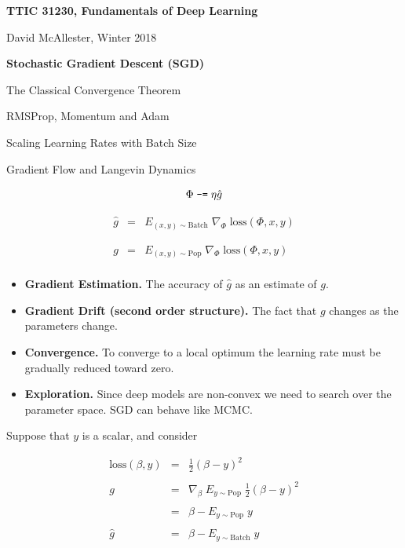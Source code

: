 


\newcommand{\solution}[1]{\bigskip {\bf Solution}: #1}



{\Huge
  \centerline{\bf TTIC 31230, Fundamentals of Deep Learning}
  \bigskip
  \centerline{David McAllester, Winter 2018}
  \vfill
  \centerline{\bf Stochastic Gradient Descent (SGD)}
  \vfill
  \centerline{The Classical Convergence Theorem}
  \vfill
  \centerline{RMSProp, Momentum and Adam}
  \vfill
  \centerline{Scaling Learning Rates with Batch Size}
  \vfill
  \centerline{Gradient Flow and Langevin Dynamics}
  

$$\Phi \;\mbox{\tt -=}\; \eta \hat{g}$$

\vfill
\begin{eqnarray*}
  \hat{g} & = & E_{(x,y) \sim \mathrm{Batch}}\;\nabla_\Phi\;\mathrm{loss}(\Phi,x,y) \\
  \\
  \\
  g & = & E_{(x,y) \sim \mathrm{Pop}}\;\nabla_\Phi\;\mathrm{loss}(\Phi,x,y) \\
\end{eqnarray*}


\vfill
\begin{itemize}
\item {\bf Gradient Estimation.} The accuracy of $\hat{g}$ as an estimate of $g$.

  \vfill
\item {\bf Gradient Drift (second order structure).} The fact that $g$ changes as the parameters change.

  \vfill
\item {\bf Convergence.} To converge to a local optimum the learning rate must be gradually reduced toward zero.

  \vfill
  \item {\bf Exploration.} Since deep models are non-convex we need to search over the parameter space.  SGD can behave like MCMC.
\end{itemize}


Suppose that $y$ is a scalar, and consider

\begin{eqnarray*}
 \mathrm{loss}(\beta,y) & = & \frac{1}{2}(\beta - y)^2 \\
 \\
  g & = &  \nabla_\beta\;E_{y \sim \mathrm{Pop}}\;\frac{1}{2}(\beta - y)^2 \\
  \\
  & = & \beta - E_{y \sim \mathrm{Pop}} \; y \\
  \\
  \hat{g} & = &\beta - E_{y \sim \mathrm{Batch}} \;y
\end{eqnarray*}

}
